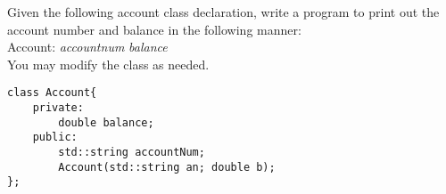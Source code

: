 \documentclass[addpoints,12pt]{exam}
\begin{document}

\begin{center}
\end{center}
\vspace{0.1in}
\begin{center}
\gradetable[h][questions]
\end{center}

\begin{questions}
\question[10] Given the following account class declaration, write a
program to print out the account number and balance in the following
manner:\\
Account: \textit{accountnum} \textit{balance}\\
You may modify the class as needed. 

\begin{verbatim}
class Account{
    private:
        double balance;
    public: 
        std::string accountNum;
        Account(std::string an; double b);
};

\end{verbatim}

\end{questions}
\end{document}
